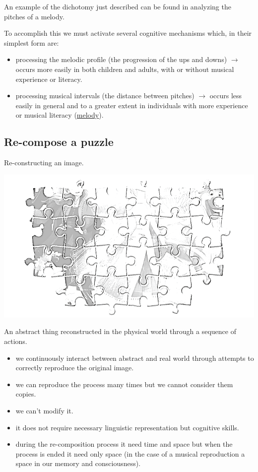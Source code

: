 An example of the dichotomy just described can be found in analyzing the pitches of a melody.

To accomplish this we must activate several cognitive mechanisms which, in their simplest form are:

\begin{itemize}
\item processing the melodic profile (the progression of the ups and downs)  \(\rightarrow\) occurs more easily in both children and adults, with or without musical experience or literacy.
\item processing musical intervals (the distance between pitches) \(\rightarrow\) occurs less easily in general and to a greater extent in individuals with more experience or musical literacy (\href{veloso.mp3}{melody}).
\end{itemize}

\subsection{Re-compose a puzzle}\label{re-compose-a-puzzle}

Re-constructing an image.

\begin{center}
\includegraphics[scale=0.5]{../img/puzzle.png}
\end{center}

An abstract thing reconstructed in the physical world through a sequence of actions.

\begin{itemize}
\tightlist
\item we continuously interact between abstract and real world through attempts to correctly reproduce the original image.
\item we can reproduce the process many times but we cannot consider them copies.
\item we can't modify it.
\item it does not require necessary linguistic representation but cognitive skills.
\item during the re-composition process it need time and space but when the process is ended it need only space (in the case of a musical reproduction a space in our memory and consciousness).
\end{itemize}

